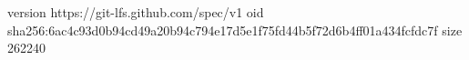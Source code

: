 version https://git-lfs.github.com/spec/v1
oid sha256:6ac4c93d0b94cd49a20b94c794e17d5e1f75fd44b5f72d6b4ff01a434fcfdc7f
size 262240
